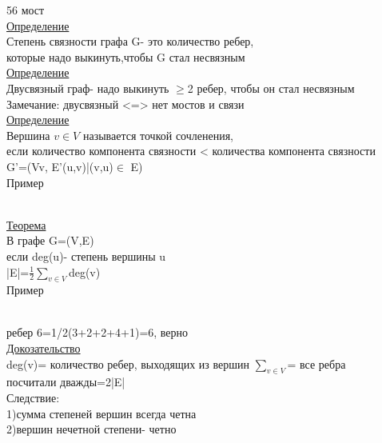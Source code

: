 \documentclass{article}
\begin{document}
56 мост\\
\underline{Определение}\\
Степень связности графа G- это количество ребер,\\
которые надо выкинуть,чтобы G стал несвязным\\
\underline{Определение}\\
Двусвязный граф- надо выкинуть $\geq$2 ребер, чтобы он стал несвязным\\
Замечание: двусвязный <=> нет мостов и связи\\
\underline{Определение}\\
Вершина $v\in V$ называется точкой сочленения,\\
если количество компонента связности < количества компонента связности\\
G'=(V{v}, E'{(u,v)|(v,u)$\in$ E})\\
Пример
\\
\underline{Теорема}\\
В графе G=(V,E)\\
если deg(u)- степень вершины u\\
|E|=$\frac{1}{2} \sum \limits_{v\in V}$deg(v)\\
Пример\\
\\
ребер 6=1/2(3+2+2+4+1)=6, верно\\
\underline{Докозательство}\\
deg(v)= количество ребер, выходящих из вершин $\sum \limits_{v\in V}$= все ребра\\
посчитали дважды=2|E|\\
Следствие:\\
1)сумма степеней вершин всегда четна\\
2)вершин нечетной степени- четно\\
\end{document}
